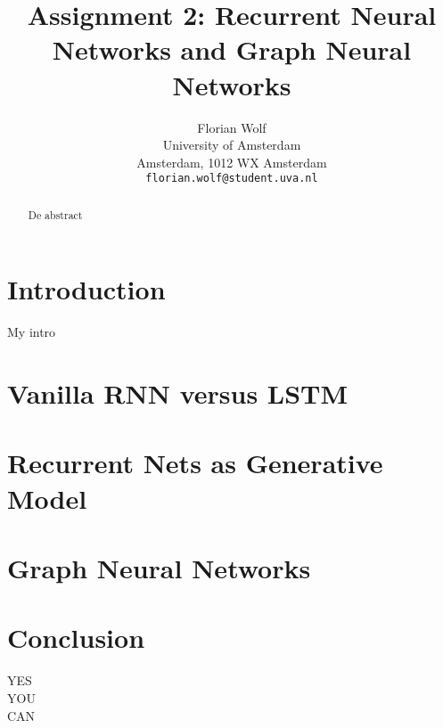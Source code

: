 \documentclass{article}
\title{Assignment 2: Recurrent Neural Networks and Graph Neural Networks}
\author{%
  Florian Wolf \\
  University of Amsterdam\\
  Amsterdam, 1012 WX Amsterdam \\
  \texttt{florian.wolf@student.uva.nl}
}
\begin{document}

\maketitle

\begin{abstract}
De abstract
\end{abstract}

\section{Introduction}

My intro\cite{alexnet}

\section{Vanilla RNN versus LSTM}



\section{Recurrent Nets as Generative Model}



\section{Graph Neural Networks}



\section{}

\section{Conclusion}

\begin{center}
    YES\\
    YOU\\
    CAN
\end{center}


\end{document}
